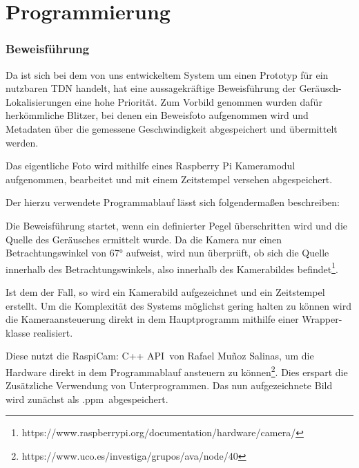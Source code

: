\section{Programmierung}

\subsubsection{Beweisführung}

Da ist sich bei dem von uns entwickeltem System um einen Prototyp für ein nutzbaren TDN handelt, hat eine aussagekräftige Beweisführung der Geräusch-Lokalisierungen eine hohe Priorität. Zum Vorbild genommen wurden dafür herkömmliche \glqq Blitzer\grqq, bei denen ein Beweisfoto aufgenommen wird und Metadaten über die gemessene Geschwindigkeit abgespeichert und übermittelt werden.

Das eigentliche Foto wird mithilfe eines Raspberry Pi Kameramodul aufgenommen, bearbeitet und mit einem Zeitstempel versehen abgespeichert. 

Der hierzu verwendete Programmablauf lässt sich folgendermaßen beschreiben: 


Die Beweisführung startet, wenn ein definierter Pegel überschritten wird und die Quelle des Geräusches ermittelt wurde. Da die Kamera nur einen Betrachtungswinkel von \ang{67} aufweist, wird nun überprüft, ob sich die Quelle innerhalb des Betrachtungswinkels, also innerhalb des Kamerabildes befindet\footnote{https://www.raspberrypi.org/documentation/hardware/camera/}.

Ist dem der Fall, so wird ein Kamerabild aufgezeichnet und ein Zeitstempel erstellt. Um die Komplexität des Systems möglichst gering halten zu können wird die Kameraansteuerung direkt in dem Hauptprogramm mithilfe einer Wrapper-klasse realisiert. 

Diese nutzt die \glqq RaspiCam: C++ API\grqq\ von Rafael Muñoz Salinas, um die Hardware direkt in dem Programmablauf ansteuern zu können\footnote{https://www.uco.es/investiga/grupos/ava/node/40}. Dies erspart die Zusätzliche Verwendung von Unterprogrammen. Das nun aufgezeichnete Bild wird zunächst als \glqq .ppm\grqq\ abgespeichert. 

